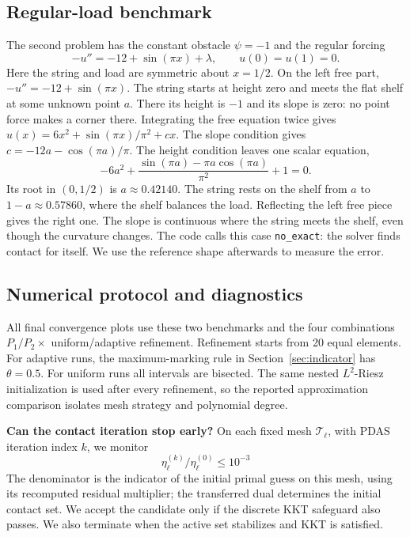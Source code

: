 \documentclass[11pt,a4paper]{article}
\newcommand{\subsect}[1]{\Needspace{5\baselineskip}\subsection{#1}}
\begin{document}
\subsect{Regular-load benchmark}\label{sec:regular}
The second problem has the constant obstacle $\psi=-1$ and the regular
forcing
\begin{equation}\label{eq:regular-case}
 \boxed{-u''=-12+\sin(\pi x)+\lambda,\qquad u(0)=u(1)=0.}
\end{equation}
Here the string and load are symmetric about $x=1/2$. On the left free part, $-u''=-12+\sin(\pi x)$. The string starts at height zero and meets the flat shelf at some unknown point $a$. There its height is $-1$ and its slope is zero: no point force makes a corner there. Integrating the free equation twice gives $u(x)=6x^2+\sin(\pi x)/\pi^2+cx$. The slope condition gives $c=-12a-\cos(\pi a)/\pi$. The height condition leaves one scalar equation,
\begin{equation}\label{eq:regular-boundary}
 -6a^2+\frac{\sin(\pi a)-\pi a\cos(\pi a)}{\pi^2}+1=0 .
\end{equation}
Its root in $(0,1/2)$ is $a\approx0.42140$. The string rests on the shelf from $a$ to $1-a\approx0.57860$, where the shelf balances the load. Reflecting the left free piece gives the right one. The slope is continuous where the string meets the shelf, even though the curvature changes. The code calls this case \texttt{no\_exact}: the solver finds contact for itself. We use the reference shape afterwards to measure the error.

\subsect{Numerical protocol and diagnostics}\label{sec:protocol}
All final convergence plots use these two benchmarks and the four
combinations $P_1/P_2\times$ uniform/adaptive refinement. Refinement starts
from 20 equal elements. For adaptive runs, the maximum-marking rule in
Section~\ref{sec:indicator} has $\theta=0.5$. For uniform runs all
intervals are bisected. The same nested $L^2$-Riesz initialization is used
after every refinement, so the reported approximation comparison isolates
mesh strategy and polynomial degree.

\textbf{Can the contact iteration stop early?} On each fixed mesh
$\mathcal T_\ell$, with PDAS iteration index $k$, we monitor
\begin{equation}\label{eq:inner-stop}
 \boxed{\eta_\ell^{(k)}/\eta_\ell^{(0)}\leq10^{-3}}
\end{equation}
The denominator is the indicator of the initial primal guess on this mesh,
using its recomputed residual multiplier; the transferred dual determines the
initial contact set. We accept the candidate only if the discrete KKT safeguard also passes.
We also terminate when the active set stabilizes and KKT is satisfied.
\end{document}
